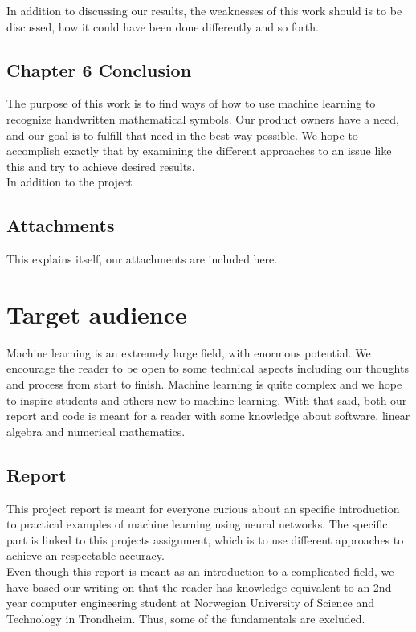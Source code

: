 % 
In addition to discussing our results, the weaknesses of this work should is to be discussed, how it could have been done differently and so forth. 

\subsection{Chapter 6 Conclusion}
The purpose of this work is to find ways of how to use machine learning to recognize handwritten mathematical symbols. Our product owners have a need, and our goal is to fulfill that need in the best way possible. We hope to accomplish exactly that by examining the different approaches to an issue like this and try to achieve desired results.\\
In addition to the project 

\subsection{Attachments}
This explains itself, our attachments are included here. 

\section{Target audience}
Machine learning is an extremely large field, with enormous potential. We encourage the reader to be open to some technical aspects including our thoughts and process from start to finish. Machine learning is quite complex and we hope to inspire students and others new to machine learning. With that said, both our report and code is meant for a reader with some knowledge about software, linear algebra and numerical mathematics.

\subsection{Report} %
This project report is meant for everyone curious about an specific introduction to practical examples of machine learning using neural networks. The specific part is linked to this projects assignment, which is to use different approaches to achieve an respectable accuracy.\\
Even though this report is meant as an introduction to a complicated field, we have based our writing on that the reader has knowledge equivalent to an 2nd year computer engineering student at Norwegian University of Science and Technology in Trondheim. Thus, some of the fundamentals are excluded. %


